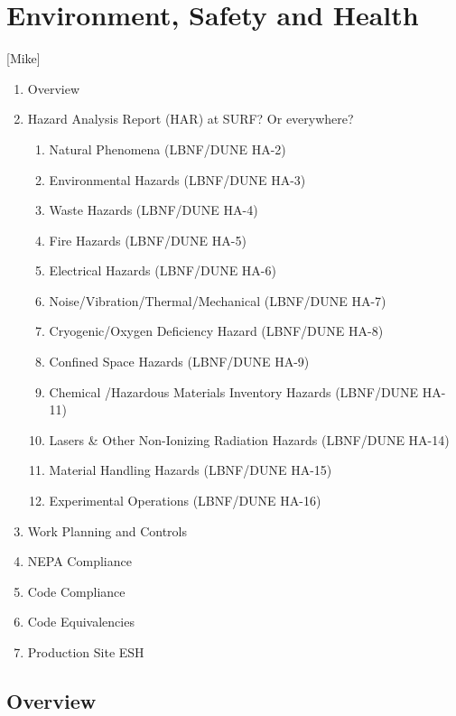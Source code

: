 \chapter{Environment, Safety and Health}
\label{vl:tc-ESH}

[Mike]

\begin{enumerate}
 \item Overview
 \item Hazard Analysis Report (HAR) at SURF? Or everywhere?
 \begin{enumerate}
   \item Natural Phenomena (LBNF/DUNE HA-2)
   \item Environmental Hazards (LBNF/DUNE HA-3)
   \item Waste Hazards (LBNF/DUNE HA-4)
   \item Fire Hazards (LBNF/DUNE HA-5)
   \item Electrical Hazards (LBNF/DUNE HA-6)
     \item Noise/Vibration/Thermal/Mechanical (LBNF/DUNE HA-7)
     \item Cryogenic/Oxygen Deficiency Hazard (LBNF/DUNE HA-8)
     \item Confined Space Hazards (LBNF/DUNE HA-9)
     \item Chemical /Hazardous Materials Inventory Hazards (LBNF/DUNE HA-11)
     \item Lasers \& Other Non-Ionizing Radiation Hazards (LBNF/DUNE HA-14)
     \item Material Handling Hazards (LBNF/DUNE HA-15)
     \item Experimental Operations (LBNF/DUNE HA-16)
 \end{enumerate}
 \item Work Planning and Controls
 \item NEPA Compliance
 \item Code Compliance
 \item Code Equivalencies
 \item Production Site ESH
\end{enumerate}

\section{Overview}


